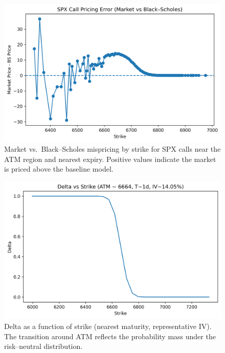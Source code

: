 \documentclass[12pt]{article}
\begin{document}
\begin{figure}[H]
\centering
\includegraphics[width=0.85\linewidth]{pricing_error_vs_strike.png}
\caption{Market vs.\ Black--Scholes mispricing by strike for SPX calls near the ATM region and nearest expiry.
Positive values indicate the market is priced above the baseline model.}
\label{fig:pricing-error}
\end{figure}

\begin{figure}[H]
\centering
\includegraphics[width=0.85\linewidth]{delta_vs_strike.png}
\caption{Delta as a function of strike (nearest maturity, representative IV). The transition around ATM reflects
the probability mass under the risk--neutral distribution.}
\label{fig:delta}
\end{figure}
\end{document}

